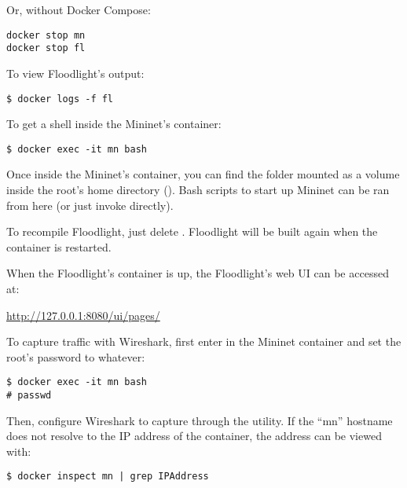 Or, without Docker Compose:
\begin{verbatim}
docker stop mn
docker stop fl
\end{verbatim}

To view Floodlight's output:
\begin{verbatim}
$ docker logs -f fl
\end{verbatim}

To get a shell inside the Mininet's container:
\begin{verbatim}
$ docker exec -it mn bash
\end{verbatim}
Once inside the Mininet's container, you can find the  folder
mounted as a volume inside the root's home directory ().
Bash scripts to start up Mininet can be ran from here (or just invoke 
directly).

To recompile Floodlight, just delete . Floodlight
will be built again when the container is restarted.

When the Floodlight's container is up, the Floodlight's web UI can be accessed
at:

\begin{center}
	\url{http://127.0.0.1:8080/ui/pages/}
\end{center}

To capture traffic with Wireshark, first enter in the Mininet container and set
the root's password to whatever:
\begin{verbatim}
$ docker exec -it mn bash
# passwd
\end{verbatim}

Then, configure Wireshark to capture through the  utility. If the
``mn'' hostname does not resolve to the IP address of the container, the address
can be viewed with:
\begin{verbatim}
$ docker inspect mn | grep IPAddress
\end{verbatim}
